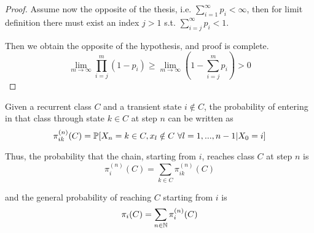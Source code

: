\begin{proof}
		\bigbreak
		Assume now the opposite of the thesis, i.e. $\sum_{i=1}^\infty p_i < \infty$, then for limit definition there must exist an index $j>1$ s.t. $\sum_{i=j}^\infty p_i < 1$.

		Then we obtain the opposite of the hypothesis, and proof is complete.
		\begin{equation*}
			\lim_{m \to \infty} \prod_{i=j}^m (1-p_i) \ge \lim_{m \to \infty} (1-\sum_{i=j}^m p_i) > 0
		\end{equation*}

	\end{proof}

	\begin{definition}[lesson 22/03/17] \label{def:falling_probability}
		Given a recurrent class $C$ and a transient state $i \notin C$, the probability of entering in that class through state $k \in C$ at step $n$ can be written as
		$$ \pi_{ik}^{(n)}(C) = \mathbb{P}[X_n = k \in C, x_l \notin C ~ \forall l=1, ..., n-1 | X_0 = i] $$

		Thus, the probability that the chain, starting from $i$, reaches class $C$ at step $n$ is
		$$ \pi_{i}^{(n)}(C) = \sum_{k \in C} \pi_{ik}^{(n)}(C) $$

		and the general probability of reaching $C$ starting from $i$ is
		$$ \pi_i(C) = \sum_{n \in \mathbb{N}} \pi_i^{(n)}(C) $$
	\end{definition}

